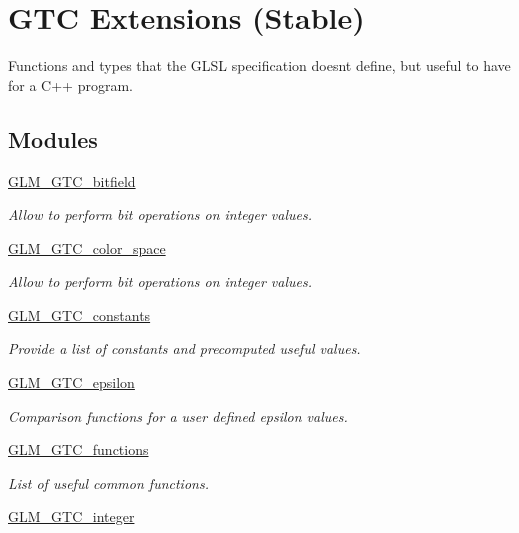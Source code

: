 \hypertarget{group__gtc}{}\section{G\+TC Extensions (Stable)}
\label{group__gtc}


Functions and types that the G\+L\+SL specification doesn\textquotesingle{}t define, but useful to have for a C++ program.  


\subsection*{Modules}
\begin{DoxyCompactItemize}
\item 
\mbox{\hyperlink{group__gtc__bitfield}{G\+L\+M\+\_\+\+G\+T\+C\+\_\+bitfield}}
\begin{DoxyCompactList}\small\item\em Allow to perform bit operations on integer values. \end{DoxyCompactList}\item 
\mbox{\hyperlink{group__gtc__color__space}{G\+L\+M\+\_\+\+G\+T\+C\+\_\+color\+\_\+space}}
\begin{DoxyCompactList}\small\item\em Allow to perform bit operations on integer values. \end{DoxyCompactList}\item 
\mbox{\hyperlink{group__gtc__constants}{G\+L\+M\+\_\+\+G\+T\+C\+\_\+constants}}
\begin{DoxyCompactList}\small\item\em Provide a list of constants and precomputed useful values. \end{DoxyCompactList}\item 
\mbox{\hyperlink{group__gtc__epsilon}{G\+L\+M\+\_\+\+G\+T\+C\+\_\+epsilon}}
\begin{DoxyCompactList}\small\item\em Comparison functions for a user defined epsilon values. \end{DoxyCompactList}\item 
\mbox{\hyperlink{group__gtc__functions}{G\+L\+M\+\_\+\+G\+T\+C\+\_\+functions}}
\begin{DoxyCompactList}\small\item\em List of useful common functions. \end{DoxyCompactList}\item 
\mbox{\hyperlink{group__gtc__integer}{G\+L\+M\+\_\+\+G\+T\+C\+\_\+integer}}

\end{DoxyCompactItemize}
